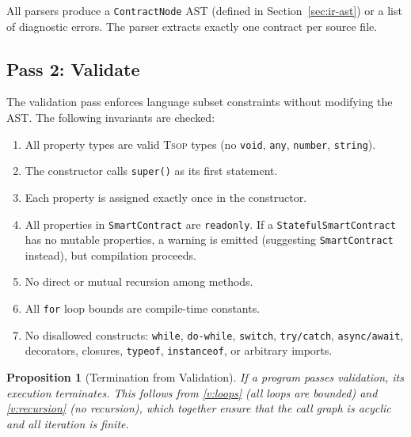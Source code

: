 \documentclass[11pt,a4paper]{article}
\newtheorem{proposition}[theorem]{Proposition}
\newcommand{\tsop}{\textsc{Tsop}}
\begin{document}
All parsers produce a \texttt{ContractNode} AST (defined in
Section~\ref{sec:ir-ast}) or a list of diagnostic errors.
The parser extracts exactly one contract per source file.

\subsection{Pass 2: Validate}
\label{sec:pass-validate}

The validation pass enforces language subset constraints without modifying
the AST. The following invariants are checked:

\begin{enumerate}[label=\textbf{V\arabic*}., ref=V\arabic*]
  \item \label{v:types} All property types are valid \tsop{} types (no
    \texttt{void}, \texttt{any}, \texttt{number}, \texttt{string}).
  \item \label{v:super} The constructor calls \texttt{super()} as its first
    statement.
  \item \label{v:assign} Each property is assigned exactly once in the
    constructor.
  \item \label{v:readonly} All properties in \texttt{SmartContract} are
    \texttt{readonly}. If a \texttt{StatefulSmartContract} has no mutable
    properties, a warning is emitted (suggesting \texttt{SmartContract}
    instead), but compilation proceeds.
  \item \label{v:recursion} No direct or mutual recursion among methods.
  \item \label{v:loops} All \texttt{for} loop bounds are compile-time
    constants.
  \item \label{v:subset} No disallowed constructs: \texttt{while},
    \texttt{do-while}, \texttt{switch}, \texttt{try/catch},
    \texttt{async/await}, decorators, closures, \texttt{typeof},
    \texttt{instanceof}, or arbitrary imports.
\end{enumerate}

\begin{proposition}[Termination from Validation]
\label{prop:termination}
If a program passes validation, its execution terminates. This follows from
\ref{v:loops} (all loops are bounded) and \ref{v:recursion} (no recursion),
which together ensure that the call graph is acyclic and all iteration is
finite.
\end{proposition}
\end{document}
